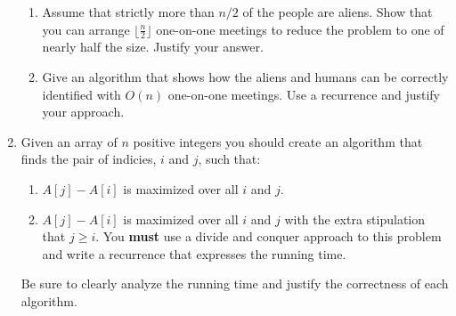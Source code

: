 \documentclass[11pt]{article}
\begin{document}
\begin{enumerate}[1.]
\begin{enumerate} 
\item  Assume that strictly more than $n/2$ of the people are aliens.  Show that you can arrange $\lfloor \frac{n}{2} \rfloor$ one-on-one meetings to reduce the problem to one of nearly half the size.  Justify your answer.  
\item  Give an algorithm that shows how the aliens and humans can be correctly identified with $O(n)$ one-on-one meetings. Use a recurrence and justify your approach.  
\end{enumerate} 

\item Given an array of $n$ positive integers you should create an algorithm that finds the pair of indicies, $i$ and $j$, such that:  

\begin{enumerate}
\item $A[j] - A[i]$ is maximized over all $i$ and $j$.  
\item $A[j] - A[i]$ is maximized over all $i$ and $j$ with the extra stipulation that $j \geq i$.  You \textbf{must} use a divide and conquer approach to this problem and write a recurrence that expresses the running time.  
\end{enumerate}

Be sure to clearly analyze the running time and justify the correctness of each algorithm. 

\end{enumerate}
\end{document}

